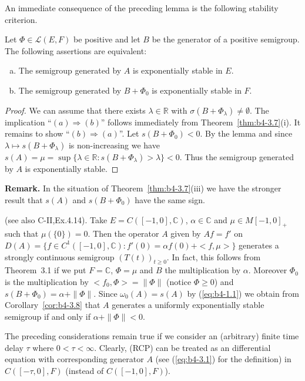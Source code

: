 An immediate consequence of the preceding lemma is the following stability criterion.

\begin{corollary}\label{cor:b4-3.8}
Let $\Phi \in \mathcal{L}(E,F)$ be positive and let $B$ be the generator of a positive semigroup. 
The following assertions are equivalent:

\begin{enumerate}[(a)]
	\item The semigroup generated by $A$ is exponentially stable in $E$.
	\item The semigroup generated by $B + \Phi_{0}$ is exponentially stable in $F$.
\end{enumerate}
\end{corollary}

\begin{proof}
We can assume that there exists $\lambda \in \mathbb{R}$ with $\sigma(B+\Phi_{\lambda}) \neq \emptyset$.
The implication \enquote{$(a)\Rightarrow(b)$} follows immediately from Theorem~\ref{thm:b4-3.7}(i).
It remains to show \enquote{$(b)\Rightarrow(a)$}. 
Let $s(B+\Phi_{0}) < 0$. 
By the lemma and since $\lambda \mapsto s(B+\Phi_{\lambda})$ is non-increasing we have $s(A) = \mu = \sup\{\lambda \in \mathbb{R} \colon s(B+\Phi_{\lambda}) > \lambda\} < 0$. 
Thus the semigroup generated by $A$ is exponentially stable.
\end{proof}

\medskip\noindent
\textbf{Remark.}\quad
In the situation of Theorem~\ref{thm:b4-3.7}(iii) we have the stronger result that $s(A)$ and $s(B + \Phi_{0})$ have the same sign.

\begin{example}\label{ex:b4-3.9}
(see also C-II,Ex.4.14). Take $E = C([-1,0],\mathbb{C})$, $\alpha \in \mathbb{C}$ and $\mu \in M[-1,0]_{+}$ such that $\mu(\{0\}) = 0$. 
Then the operator $A$ given by $Af = f'$ on $D(A) = \{f \in C^1([-1,0],\mathbb{C}) \colon f'(0) = \alpha f(0) + <f,\mu>\}$ generates a strongly continuous semigroup $(T(t))_{t\geq0}$. 
In fact, this follows from Theorem~3.1 if we put $F = \mathbb{C}$, $\Phi = \mu$ and $B$ the multiplication by $\alpha$. 
Moreover $\Phi_{0}$ is the multiplication by $<f_{0},\Phi> = \|\Phi\|$ (notice $\Phi\geq0$) and $s(B + \Phi_{0}) = \alpha + \|\Phi\|$. 
Since $\omega_{0}(A) = s(A)$ by (\ref{eq:b4-1.1}) we obtain from Corollary~\ref{cor:b4-3.8} that $A$ generates a uniformly exponentially stable semigroup if and only if $\alpha + \|\Phi\| < 0$.
\end{example}
%
%
%
%
\newpage
%
The preceding considerations remain true if we consider an (arbitrary) finite time delay $\tau$ where $0 < \tau < \infty$. 
Clearly, (RCP) can be treated as an differential equation with corresponding generator $A$ (see (\ref{eq:b4-3.1}) for the definition) in $C([-\tau,0],F)$ (instead of $C([-1,0],F)$).

